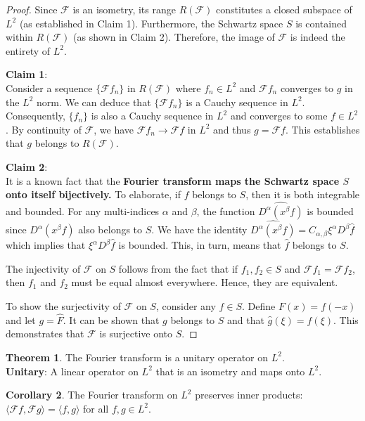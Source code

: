 \documentclass[12pt,openany]{book}
\theoremstyle{definition}
\newtheorem{theorem}{Theorem}[section]
\newtheorem{corollary}[theorem]{Corollary}
\begin{document}
\begin{proof}
    Since $\mathcal{F}$ is an isometry, its range $R(\mathcal{F})$ constitutes a closed subspace of $L^2$ (as established in Claim 1). Furthermore, the Schwartz space $S$ is contained within $R(\mathcal{F})$ (as shown in Claim 2). Therefore, the image of $\mathcal{F}$ is indeed the entirety of $L^2$.

\noindent\textbf{Claim 1}:\\
Consider a sequence $\{\mathcal{F} f_n\}$ in $R(\mathcal{F})$ where $f_n \in L^2$ and $\mathcal{F} f_n$ converges to $g$ in the $L^2$ norm. We can deduce that $\{\mathcal{F} f_n\}$ is a Cauchy sequence in $L^2$. Consequently, $\{f_n\}$ is also a Cauchy sequence in $L^2$ and converges to some $f \in L^2$. By continuity of $\mathcal{F}$, we have $\mathcal{F} f_n \rightarrow \mathcal{F} f$ in $L^2$ and thus $g = \mathcal{F} f$. This establishes that $g$ belongs to $R(\mathcal{F})$.

\noindent\textbf{Claim 2}:\\
It is a known fact that the \textbf{Fourier transform maps the Schwartz space $S$ onto itself bijectively.}
To elaborate, if $f$ belongs to $S$, then it is both integrable and bounded. For any multi-indices $\alpha$ and $\beta$, the function $\widehat{D^\alpha(x^\beta f)}$ is bounded since $D^\alpha(x^\beta f)$ also belongs to $S$. We have the identity $\widehat{D^\alpha(x^\beta f)} = C_{\alpha, \beta} \xi^\alpha D^\beta \hat{f}$ which implies that $\xi^\alpha D^\beta \hat{f}$ is bounded. This, in turn, means that $\hat{f}$ belongs to $S$.

The injectivity of $\mathcal{F}$ on $S$ follows from the fact that if $f_1, f_2 \in S$ and $\mathcal{F} f_1 = \mathcal{F} f_2$, then $f_1$ and $f_2$ must be equal almost everywhere. Hence, they are equivalent.

To show the surjectivity of $\mathcal{F}$ on $S$, consider any $f \in S$. Define $F(x) = f(-x)$ and let $g = \hat{F}$. It can be shown that $g$ belongs to $S$ and that $\hat{g}(\xi) = f(\xi)$. This demonstrates that $\mathcal{F}$ is surjective onto $S$.
\end{proof}
\begin{theorem}
    The Fourier transform is a unitary operator on $L^2$. \\
    \noindent\textbf{Unitary}: A linear operator on $L^2$ that is an isometry and maps onto $L^2$.
\end{theorem}
\begin{corollary}
    The Fourier transform on $L^2$ preserves inner products: $\langle\mathcal{F}f, \mathcal{F}g\rangle = \langle f, g\rangle$ for all $f, g \in L^2$.
\end{corollary}
\end{document}

